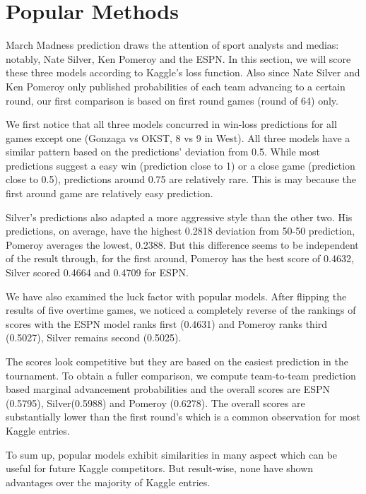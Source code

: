 \documentclass[10pt,a4paper]{article}
\begin{document}
\section{Popular Methods}
March Madness prediction draws the attention of sport analysts and medias: notably, Nate Silver, Ken Pomeroy and the ESPN. In this section, we will score these three models according to Kaggle's loss function. Also since Nate Silver and Ken Pomeroy only published probabilities of each team advancing to a certain round, our first comparison is based on first round games (round of 64) only. 
  
We first notice that all three models concurred in win-loss predictions for all games  except one (Gonzaga vs OKST, 8 vs 9 in West). All three models have a similar pattern based on the predictions' deviation from 0.5. While most predictions suggest a easy win (prediction close to 1) or a close game (prediction close to 0.5), predictions around 0.75 are relatively rare. This is may because the first around game are relatively easy prediction.

Silver's predictions also adapted a more aggressive style than the other two. His predictions, on average, have the highest 0.2818  deviation from 50-50 prediction, Pomeroy averages the lowest, 0.2388. But this difference seems to be independent of the result through, for the first around, Pomeroy has the best score of 0.4632, Silver scored 0.4664 and 0.4709 for ESPN. 

We have also examined the luck factor with popular models. After flipping the results of five overtime games, we noticed a completely reverse of the rankings of scores with the ESPN model ranks first (0.4631) and Pomeroy ranks third (0.5027), Silver remains second (0.5025).

The scores look competitive but they are based on the easiest prediction in the tournament. To obtain a fuller comparison, we compute team-to-team prediction based marginal advancement probabilities and  the overall scores are ESPN (0.5795), Silver(0.5988) and Pomeroy (0.6278). The overall scores are substantially lower than the first round's which is a common observation for most Kaggle entries.    

To sum up, popular models exhibit similarities in many aspect which can be useful for future Kaggle competitors. But result-wise, none have shown advantages over the majority of Kaggle entries. 
 
\end{document}
